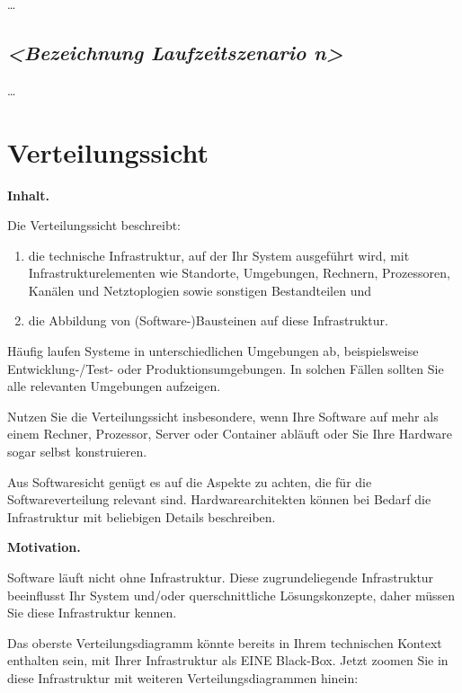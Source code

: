 \documentclass[]{article}
\begin{document}
\ldots{}

\subsection{\texorpdfstring{\emph{\textless{}Bezeichnung
Laufzeitszenario
n\textgreater{}}}{\textless{}Bezeichnung Laufzeitszenario n\textgreater{}}}\label{__emphasis_bezeichnung_laufzeitszenario_n_emphasis}

\ldots{}

\section{Verteilungssicht}\label{section-deployment-view}

\textbf{Inhalt.}

Die Verteilungssicht beschreibt:

\begin{enumerate}
\def\labelenumi{\arabic{enumi}.}
\item
  die technische Infrastruktur, auf der Ihr System ausgeführt wird, mit
  Infrastrukturelementen wie Standorte, Umgebungen, Rechnern,
  Prozessoren, Kanälen und Netztoplogien sowie sonstigen Bestandteilen
  und
\item
  die Abbildung von (Software-)Bausteinen auf diese Infrastruktur.
\end{enumerate}

Häufig laufen Systeme in unterschiedlichen Umgebungen ab, beispielsweise
Entwicklung-/Test- oder Produktionsumgebungen. In solchen Fällen sollten
Sie alle relevanten Umgebungen aufzeigen.

Nutzen Sie die Verteilungssicht insbesondere, wenn Ihre Software auf
mehr als einem Rechner, Prozessor, Server oder Container abläuft oder
Sie Ihre Hardware sogar selbst konstruieren.

Aus Softwaresicht genügt es auf die Aspekte zu achten, die für die
Softwareverteilung relevant sind. Hardwarearchitekten können bei Bedarf
die Infrastruktur mit beliebigen Details beschreiben.

\textbf{Motivation.}

Software läuft nicht ohne Infrastruktur. Diese zugrundeliegende
Infrastruktur beeinflusst Ihr System und/oder querschnittliche
Lösungskonzepte, daher müssen Sie diese Infrastruktur kennen.

Das oberste Verteilungsdiagramm könnte bereits in Ihrem technischen
Kontext enthalten sein, mit Ihrer Infrastruktur als EINE Black-Box.
Jetzt zoomen Sie in diese Infrastruktur mit weiteren
Verteilungsdiagrammen hinein:
\end{document}
